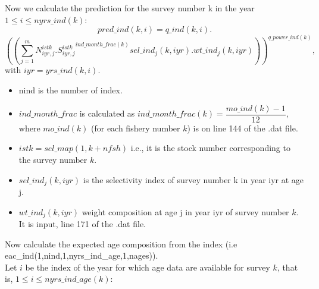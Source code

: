 \documentclass{article}
\begin{document}
Now we calculate the prediction for the survey number k in the year $1\leq i \leq nyrs\_ind(k)$:
\begin{equation}
    pred\_ind(k,i)=q\_ind(k,i).
\end{equation}
\begin{equation}
    \left(\left(\sum_{j=1}^mN^{istk}_{iyr,j}.{S^{istk}_{iyr,j}}^{ind\_month\_frac(k)}sel\_ind_j(k,iyr).wt\_ind_j(k,iyr)\right)\right)^{q\_power\_ind(k)},
\end{equation}
with $iyr=yrs\_ind(k,i)$.
\begin{itemize}
\item nind is the number of index.

    \item $ind\_month\_frac$ is calculated as $ind\_month\_frac(k)=\dfrac{mo\_ind(k)-1}{12}$, where $mo\_ind(k)$ (for each fishery number $k$) is on line 144 of the .dat file.
    \item $istk=sel\_map(1,k+nfsh)$ 
i.e., it is the stock number corresponding to the survey number $k$.
    \item $sel\_ind_j(k,iyr)$ 
is the selectivity index of survey number k in year iyr at age j.
    \item $wt\_ind_j(k,iyr)$ 
weight composition at age j in year iyr of survey number $k$. It is input, line 171 of the .dat file.
    \end{itemize}
    Now calculate the expected age composition from the index (i.e eac\_ind(1,nind,1,nyrs\_ind\_age,1,nages)).\\
Let $i$ be the index of the year for which age data are available for survey $k$, that is, $1\leq i \leq nyrs\_ind\_age(k)$:
\end{document}
